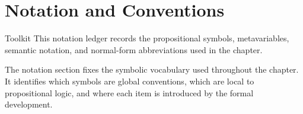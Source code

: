 \section{Notation and Conventions}

\begin{toolkitbox}{Toolkit}
This notation ledger records the propositional symbols, metavariables,
semantic notation, and normal-form abbreviations used in the chapter.
\end{toolkitbox}

\begin{remark*}[Exposition]
The notation section fixes the symbolic vocabulary used throughout the chapter.
It identifies which symbols are global conventions, which are local to
propositional logic, and where each item is introduced by the formal
development.
\end{remark*}


